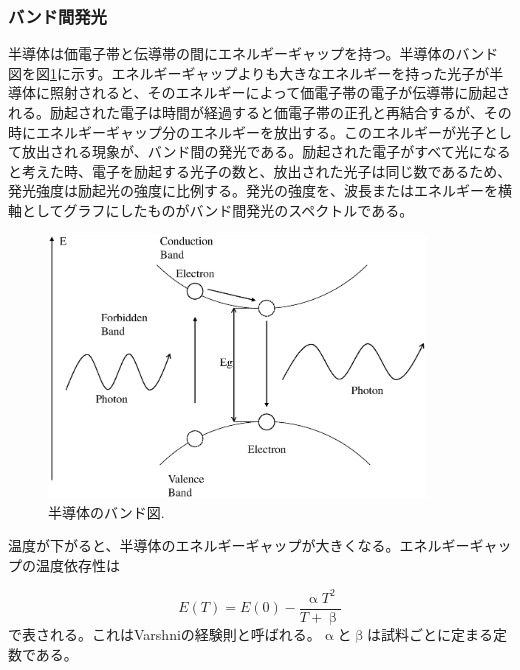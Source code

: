 \documentclass[11pt,a4j]{jsarticle}
\begin{document}
\subsubsection{バンド間発光}
半導体は価電子帯と伝導帯の間にエネルギーギャップを持つ。半導体のバンド図を図\ref{fig_band1}に示す。エネルギーギャップよりも大きなエネルギーを持った光子が半導体に照射されると、そのエネルギーによって価電子帯の電子が伝導帯に励起される。励起された電子は時間が経過すると価電子帯の正孔と再結合するが、その時にエネルギーギャップ分のエネルギーを放出する。このエネルギーが光子として放出される現象が、バンド間の発光である。励起された電子がすべて光になると考えた時、電子を励起する光子の数と、放出された光子は同じ数であるため、発光強度は励起光の強度に比例する。発光の強度を、波長またはエネルギーを横軸としてグラフにしたものがバンド間発光のスペクトルである。%

\begin{figure}[h]
 \centering
 \includegraphics[clip,width=10cm]{start_semiconductor.eps}
 \caption{半導体のバンド図.}
 \label{fig_band1}
\end{figure}

温度が下がると、半導体のエネルギーギャップが大きくなる。エネルギーギャップの温度依存性は

\begin{equation}
 E(T)=E(0)-\frac{\upalpha T^{2}}{T+\upbeta}
 \label{eq_varshni}
\end{equation}
で表される\cite{varshni}。これはVarshniの経験則と呼ばれる。$\upalpha$と$\upbeta$は試料ごとに定まる定数である。

\end{document}
